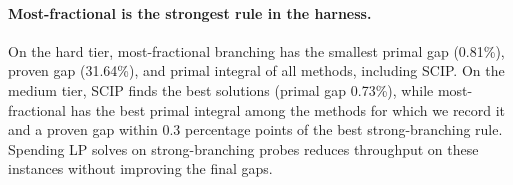 \documentclass[11pt,a4paper]{article}
\begin{document}
%
%

\paragraph{Most-fractional is the strongest rule in the harness.}
On the hard tier, most-fractional branching has the smallest primal gap (0.81\%), proven gap (31.64\%), and primal integral of all methods, including SCIP. On the medium tier, SCIP finds the best solutions (primal gap 0.73\%), while most-fractional has the best primal integral among the methods for which we record it and a proven gap within 0.3 percentage points of the best strong-branching rule. Spending LP solves on strong-branching probes reduces throughput on these instances without improving the final gaps.
\end{document}
